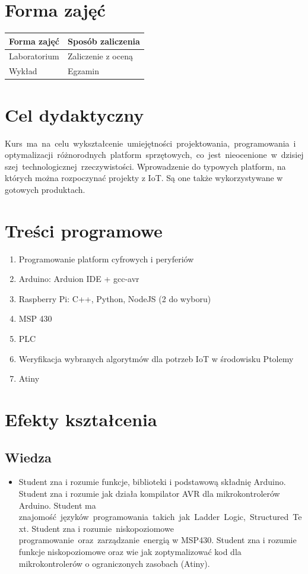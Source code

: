 \documentclass[12pt, a4paper]{article}
\begin{document}
\section{Forma zajęć}

\begin{tabular}{ll}
  \hline
  \textbf{Forma zajęć} & \textbf{Sposób zaliczenia} \\
  \hline
  Laboratorium & Zaliczenie z oceną \\
  Wykład & Egzamin \\
  \hline
\end{tabular}

\section{Cel dydaktyczny}

Kurs ma na celu wykształcenie umiejętności projektowania, programowania i optymalizacji różnorodnych platform sprzętowych, co jest nieocenione w dzisiejszej technologicznej rzeczywistości. Wprowadzenie do typowych platform, na których można rozpoczynać projekty z IoT. Są one także wykorzystywane w gotowych produktach.

\section{Treści programowe}

\begin{enumerate}
  \item Programowanie platform cyfrowych i peryferiów
  \item Arduino: Arduion IDE + gcc-avr
  \item Raspberry Pi: C++, Python, NodeJS (2 do wyboru)
  \item MSP 430
  \item PLC
  \item Weryfikacja wybranych algorytmów dla potrzeb IoT w środowisku Ptolemy
  \item Atiny
\end{enumerate}

\section{Efekty kształcenia}

\subsection*{Wiedza}
\begin{itemize}
  \item Student zna i rozumie funkcje, biblioteki i podstawową składnię Arduino.  Student zna i rozumie jak działa kompilator AVR dla mikrokontrolerów Arduino. Student ma znajomość języków programowania takich jak Ladder Logic, Structured Text. Student zna i rozumie niskopoziomowe programowanie oraz zarządzanie energią w MSP430. Student zna i rozumie funkcje niskopoziomowe oraz wie jak zoptymalizować kod dla mikrokontrolerów o ograniczonych zasobach (Atiny).
\end{itemize}
\end{document}
